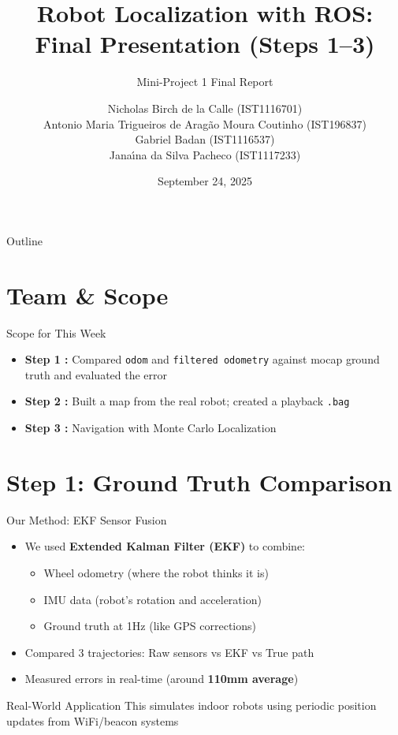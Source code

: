 \documentclass[10pt]{beamer}
\title[Robot Localization with ROS]{\texorpdfstring{Robot Localization with ROS: \\Final Presentation (Steps 1–3)}{Robot Localization with ROS: Final Presentation (Steps 1–3)}}
\subtitle{Mini-Project 1 Final Report}
\author{Nicholas Birch de la Calle (IST1116701) \\
Antonio Maria Trigueiros de Arag\~{a}o Moura Coutinho (IST196837) \\
Gabriel Badan (IST1116537) \\
Jana\'{\i}na da Silva Pacheco (IST1117233)}
\institute{Instituto Superior Técnico}
\date{September 24, 2025}
\begin{document}
\begin{frame}
\titlepage
\end{frame}

\begin{frame}{Outline}
\tableofcontents
\end{frame}

\section{Team \& Scope}

\begin{frame}{Scope for This Week}
\begin{itemize}
    \item \textbf{Step 1 :} Compared \texttt{odom} and \texttt{filtered odometry} against mocap ground truth and evaluated the error
    \item \textbf{Step 2 :} Built a map from the real robot; created a playback \texttt{.bag}
    \item \textbf{Step 3 :} Navigation with Monte Carlo Localization
\end{itemize}
\end{frame}

\section{Step 1: Ground Truth Comparison}

\begin{frame}{Our Method: EKF Sensor Fusion}
\begin{itemize}
    \item We used \textbf{Extended Kalman Filter (EKF)} to combine:
    \begin{itemize}
        \item Wheel odometry (where the robot thinks it is)
        \item IMU data (robot's rotation and acceleration)
        \item Ground truth at 1Hz (like GPS corrections)
    \end{itemize}
    \item Compared 3 trajectories: Raw sensors vs EKF vs True path
    \item Measured errors in real-time (around \textbf{110mm average})
\end{itemize}

\vspace{3mm}
\begin{block}{Real-World Application}
This simulates indoor robots using periodic position updates from WiFi/beacon systems
\end{block}
\end{frame}
\end{document}
